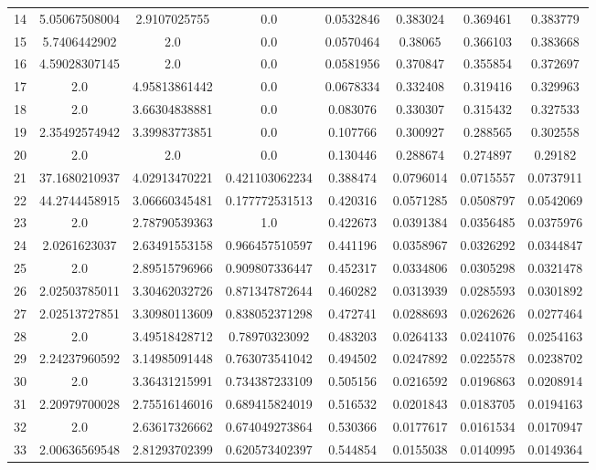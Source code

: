 \begin{longtable}{|c|c|c|c|c|c|c|c|}
14 & 5.05067508004 & 2.9107025755 & 0.0 & 0.0532846 & 0.383024 & 0.369461 & 0.383779 \\
15 & 5.7406442902 & 2.0 & 0.0 & 0.0570464 & 0.38065 & 0.366103 & 0.383668 \\
16 & 4.59028307145 & 2.0 & 0.0 & 0.0581956 & 0.370847 & 0.355854 & 0.372697 \\
17 & 2.0 & 4.95813861442 & 0.0 & 0.0678334 & 0.332408 & 0.319416 & 0.329963 \\
18 & 2.0 & 3.66304838881 & 0.0 & 0.083076 & 0.330307 & 0.315432 & 0.327533 \\
19 & 2.35492574942 & 3.39983773851 & 0.0 & 0.107766 & 0.300927 & 0.288565 & 0.302558 \\
20 & 2.0 & 2.0 & 0.0 & 0.130446 & 0.288674 & 0.274897 & 0.29182 \\
21 & 37.1680210937 & 4.02913470221 & 0.421103062234 & 0.388474 & 0.0796014 & 0.0715557 & 0.0737911 \\
22 & 44.2744458915 & 3.06660345481 & 0.177772531513 & 0.420316 & 0.0571285 & 0.0508797 & 0.0542069 \\
23 & 2.0 & 2.78790539363 & 1.0 & 0.422673 & 0.0391384 & 0.0356485 & 0.0375976 \\
24 & 2.0261623037 & 2.63491553158 & 0.966457510597 & 0.441196 & 0.0358967 & 0.0326292 & 0.0344847 \\
25 & 2.0 & 2.89515796966 & 0.909807336447 & 0.452317 & 0.0334806 & 0.0305298 & 0.0321478 \\
26 & 2.02503785011 & 3.30462032726 & 0.871347872644 & 0.460282 & 0.0313939 & 0.0285593 & 0.0301892 \\
27 & 2.02513727851 & 3.30980113609 & 0.838052371298 & 0.472741 & 0.0288693 & 0.0262626 & 0.0277464 \\
28 & 2.0 & 3.49518428712 & 0.78970323092 & 0.483203 & 0.0264133 & 0.0241076 & 0.0254163 \\
29 & 2.24237960592 & 3.14985091448 & 0.763073541042 & 0.494502 & 0.0247892 & 0.0225578 & 0.0238702 \\
30 & 2.0 & 3.36431215991 & 0.734387233109 & 0.505156 & 0.0216592 & 0.0196863 & 0.0208914 \\
31 & 2.20979700028 & 2.75516146016 & 0.689415824019 & 0.516532 & 0.0201843 & 0.0183705 & 0.0194163 \\
32 & 2.0 & 2.63617326662 & 0.674049273864 & 0.530366 & 0.0177617 & 0.0161534 & 0.0170947 \\
33 & 2.00636569548 & 2.81293702399 & 0.620573402397 & 0.544854 & 0.0155038 & 0.0140995 & 0.0149364 \\

\end{longtable}

